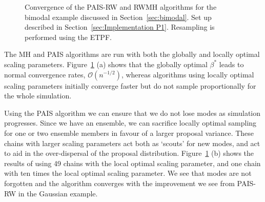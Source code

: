 \documentclass[final]{siamltex}
\begin{document}
\begin{figure}[htb]
\centering
{}
\caption{Convergence of the PAIS-RW and RWMH algorithms for the
bimodal example discussed in Section~\ref{sec:bimodal}. Set up
described in Section~\ref{sec:Implementation P1}. Resampling is
performed using the ETPF.}
\label{fig:BM2_L2}
\end{figure}

The MH and PAIS algorithms are run with both the globally and locally
optimal scaling parameters. Figure~\ref{fig:BM2_L2} (a) shows that the
globally optimal $\beta^*$ leads to normal convergence rates,
$\mathcal{O}(n^{-1/2})$, whereas algorithms using locally optimal
scaling parameters initially converge faster but do not sample
proportionally for the whole simulation.

Using the PAIS algorithm we can ensure that we do not lose modes as
simulation progresses. Since we have an ensemble, we can sacrifice
locally optimal sampling for one or two ensemble members in favour of
a larger proposal variance. These chains with larger scaling
parameters act both as `scouts' for new modes, and act to aid in the
over-dispersal of the proposal distribution. Figure~\ref{fig:BM2_L2}
(b) shows the results of using 49 chains with the local optimal
scaling parameter, and one chain with ten times the local optimal
scaling parameter. We see that modes are not forgotten and the
algorithm converges with the improvement we see from PAIS-RW in the
Gaussian example.
\end{document}
